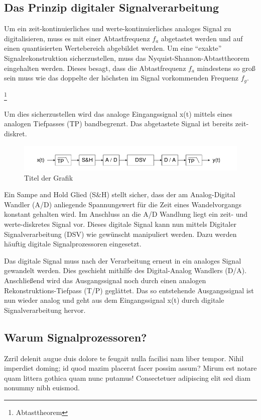 \documentclass[a4paper,12pt,fontsize=12,DIV=12]{scrartcl}
\begin{document}
\subsection{Das Prinzip digitaler Signalverarbeitung}
Um ein zeit-kontinuierliches und werte-kontinuierliches analoges Signal zu digitalisieren, muss es mit einer Abtastfrequenz $f_a$ abgetastet werden und auf einen quantisierten Wertebereich abgebildet werden. 
Um eine "`exakte"' Signalrekonstruktion sicherzustellen, muss das Nyquist-Shannon-Abtasttheorem eingehalten werden. Dieses besagt, dass die Abtastfrequenz $f_a$ mindestens so groß sein muss wie das doppelte der höchsten im Signal vorkommenden Frequenz $f_g$.
\begin{center}
 \footnote{Abtasttheorem }\\
\end{center}
Um dies sicherzustellen wird das analoge Eingangssignal x(t) mittels eines analogen Tiefpasses (TP) bandbegrenzt. Das abgetastete Signal ist bereits zeit-diskret.
%
\begin{figure}[h]
	\includegraphics[scale=0.5]{Bilder/DSV_Blockschaltbild.png}
	\caption{Titel der Grafik}
	\label{labelname}
\end{figure}
%



Ein Sampe and Hold Glied (S\&H) stellt sicher, dass der am Analog-Digital Wandler (A/D) anliegende Spannungswert für die Zeit eines Wandelvorgangs konstant gehalten wird.
Im Anschluss an die A/D Wandlung liegt ein zeit- und werte-diskretes Signal vor. Dieses digitale Signal kann nun mittels Digitaler Signalverarbeitung (DSV) wie gewünscht manipuliert werden. Dazu werden häuftig digitale Signalprozessoren eingesetzt.

Das digitale Signal muss nach der Verarbeitung erneut in ein analoges Signal gewandelt werden. Dies geschieht mithilfe des Digital-Analog Wandlers (D/A). Anschließend wird das Ausgangssignal noch durch einen analogen Rekonstruktions-Tiefpass (T/P) geglättet. Das so entstehende Ausgangssignal ist nun wieder analog und geht aus dem Eingangssignal x(t) durch digitale Signalverarbeitung hervor.

\subsection{Warum Signalprozessoren?}
Zzril delenit augue duis dolore te feugait nulla facilisi nam liber tempor. Nihil imperdiet doming; id quod mazim placerat facer possim assum? Mirum est notare quam littera gothica 
quam nunc putamus! Consectetuer adipiscing elit sed diam nonummy nibh euismod.
\end{document}
